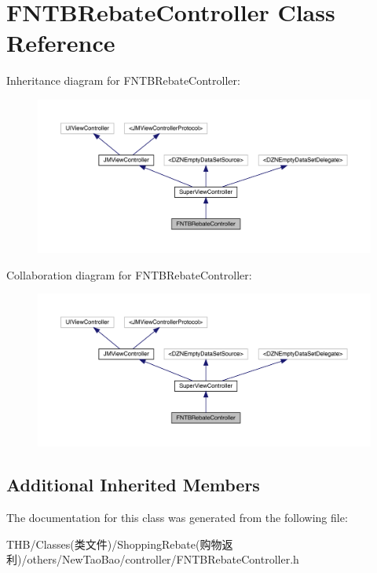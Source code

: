 \hypertarget{interface_f_n_t_b_rebate_controller}{}\section{F\+N\+T\+B\+Rebate\+Controller Class Reference}
\label{interface_f_n_t_b_rebate_controller}


Inheritance diagram for F\+N\+T\+B\+Rebate\+Controller\+:\nopagebreak
\begin{figure}[H]
\begin{center}
\leavevmode
\includegraphics[width=350pt]{interface_f_n_t_b_rebate_controller__inherit__graph}
\end{center}
\end{figure}


Collaboration diagram for F\+N\+T\+B\+Rebate\+Controller\+:\nopagebreak
\begin{figure}[H]
\begin{center}
\leavevmode
\includegraphics[width=350pt]{interface_f_n_t_b_rebate_controller__coll__graph}
\end{center}
\end{figure}
\subsection*{Additional Inherited Members}


The documentation for this class was generated from the following file\+:\begin{DoxyCompactItemize}
\item 
T\+H\+B/\+Classes(类文件)/\+Shopping\+Rebate(购物返利)/others/\+New\+Tao\+Bao/controller/F\+N\+T\+B\+Rebate\+Controller.\+h\end{DoxyCompactItemize}
